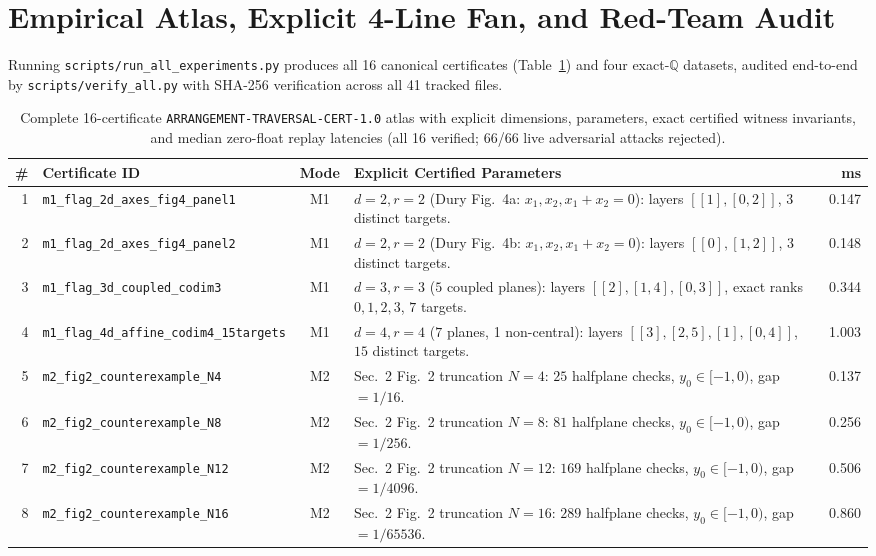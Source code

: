 \documentclass[10pt,twocolumn]{article}
\newcommand{\QQ}{\mathbb{Q}}
\begin{document}
\section{Empirical Atlas, Explicit 4-Line Fan, and Red-Team Audit}\label{sec:results}
Running \texttt{scripts/run\_all\_experiments.py} produces all 16 canonical certificates (Table~\ref{tab:atlas}) and four exact-$\QQ$ datasets, audited end-to-end by \texttt{scripts/verify\_all.py} with SHA-256 verification across all 41 tracked files.

\begin{table}[t]
\centering
\caption{Complete 16-certificate \texttt{ARRANGEMENT-TRAVERSAL-CERT-1.0} atlas with explicit dimensions, parameters, exact certified witness invariants, and median zero-float replay latencies (all 16 verified; 66/66 live adversarial attacks rejected).}
\label{tab:atlas}
\scriptsize
\setlength{\tabcolsep}{2.6pt}
\begin{tabular}{@{}r l c p{10.5cm} r@{}}
\toprule
\# & Certificate ID & Mode & Explicit Certified Parameters & ms \\
\midrule
1 & \texttt{m1\_flag\_2d\_axes\_fig4\_panel1} & M1 & $d{=}2, r{=}2$ (Dury Fig.~4a: $x_1, x_2, x_1{+}x_2{=}0$): layers $[[1],[0,2]]$, $3$ distinct targets. & 0.147 \\
2 & \texttt{m1\_flag\_2d\_axes\_fig4\_panel2} & M1 & $d{=}2, r{=}2$ (Dury Fig.~4b: $x_1, x_2, x_1{+}x_2{=}0$): layers $[[0],[1,2]]$, $3$ distinct targets. & 0.148 \\
3 & \texttt{m1\_flag\_3d\_coupled\_codim3} & M1 & $d{=}3, r{=}3$ ($5$ coupled planes): layers $[[2],[1,4],[0,3]]$, exact ranks $0,1,2,3$, $7$ targets. & 0.344 \\
4 & \texttt{m1\_flag\_4d\_affine\_codim4\_15targets} & M1 & $d{=}4, r{=}4$ ($7$ planes, 1 non-central): layers $[[3],[2,5],[1],[0,4]]$, $15$ distinct targets. & 1.003 \\
\midrule
5 & \texttt{m2\_fig2\_counterexample\_N4} & M2 & Sec.~2 Fig.~2 truncation $N{=}4$: $25$ halfplane checks, $y_0\in[-1,0)$, gap $=1/16$. & 0.137 \\
6 & \texttt{m2\_fig2\_counterexample\_N8} & M2 & Sec.~2 Fig.~2 truncation $N{=}8$: $81$ halfplane checks, $y_0\in[-1,0)$, gap $=1/256$. & 0.256 \\
7 & \texttt{m2\_fig2\_counterexample\_N12} & M2 & Sec.~2 Fig.~2 truncation $N{=}12$: $169$ halfplane checks, $y_0\in[-1,0)$, gap $=1/4096$. & 0.506 \\
8 & \texttt{m2\_fig2\_counterexample\_N16} & M2 & Sec.~2 Fig.~2 truncation $N{=}16$: $289$ halfplane checks, $y_0\in[-1,0)$, gap $=1/65536$. & 0.860 \\

\end{tabular}
\end{table}
\end{document}
